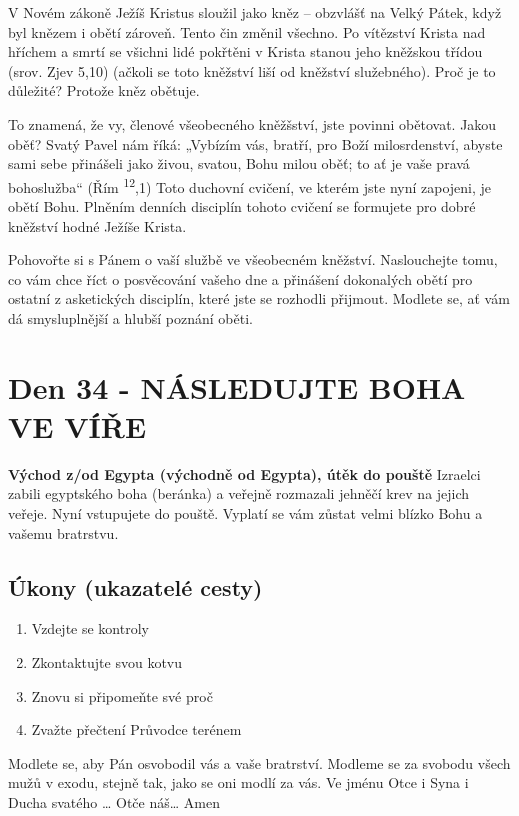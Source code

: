 \documentclass[11pt]{article}
\newcommand{\zacatekPatyTyden}{
  \textbf{Východ z/od Egypta (východně od Egypta), útěk do pouště} \newline
  Izraelci zabili egyptského boha (beránka) a veřejně rozmazali jehněčí krev na jejich veřeje. Nyní vstupujete
  do pouště. Vyplatí se vám zůstat velmi blízko Bohu a vašemu bratrstvu.

\subsection*{Úkony (ukazatelé cesty)}
\begin{enumerate}
  \item Vzdejte se kontroly
  \item Zkontaktujte svou kotvu
  \item Znovu si připomeňte své proč
  \item Zvažte přečtení Průvodce terénem
\end{enumerate}
Modlete se, aby Pán osvobodil vás a vaše bratrství. \newline
Modleme se za svobodu všech mužů v exodu, stejně tak, jako se oni modlí za vás.\newline
Ve jménu Otce i Syna i Ducha svatého …  Otče náš… Amen
}
\begin{document}
V Novém zákoně Ježíš Kristus sloužil jako kněz – obzvlášť na Velký Pátek, když byl knězem i obětí zároveň. Tento čin změnil
všechno. Po vítězství Krista nad hříchem a smrtí se všichni lidé pokřtěni v Krista stanou jeho kněžskou třídou (srov. Zjev 5,10)
(ačkoli se toto kněžství liší od kněžství služebného). Proč je to důležité? Protože kněz obětuje.

To znamená, že vy, členové všeobecného kněžšství, jste povinni obětovat. Jakou oběť? Svatý Pavel nám říká: „Vybízím vás, bratří,
pro Boží milosrdenství, abyste sami sebe přinášeli jako živou, svatou, Bohu milou oběť; to ať je vaše pravá bohoslužba“ (Řím
\textsuperscript{12},1) Toto duchovní cvičení, ve kterém jste nyní zapojeni, je obětí Bohu. Plněním denních disciplín tohoto cvičení se formujete pro
dobré kněžství hodné Ježíše Krista.

Pohovořte si s Pánem o vaší službě ve všeobecném kněžství. Naslouchejte tomu, co vám chce říct o posvěcování vašeho dne a
přinášení dokonalých obětí pro ostatní z asketických disciplín, které jste se rozhodli přijmout. Modlete se, ať vám dá smysluplnější
a hlubší poznání oběti.

\newpage
\section{Den 34 - NÁSLEDUJTE BOHA VE VÍŘE}
\zacatekPatyTyden
\end{document}
